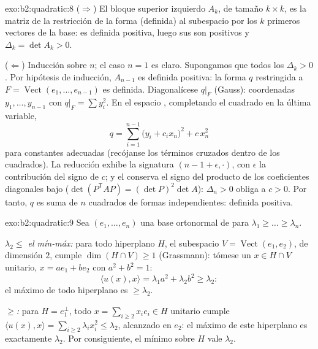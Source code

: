\begin{solution}{exo:b2:quadratic:8}
($\Rightarrow$) El bloque superior izquierdo $A_k$, de tamaño $k \times
k$, es la matriz de la restricción de la forma (definida) al subespacio
 por los $k$ primeros vectores de la base: es definida
positiva, luego sus  son positivos y $\Delta_k = \det A_k
> 0$.

($\Leftarrow$) Inducción sobre $n$; el caso $n = 1$ es claro.
Supongamos que todos los $\Delta_k > 0$. Por hipótesis de inducción,
$A_{n-1}$ es definida positiva: la forma $q$ restringida a $F =
\operatorname{Vect}(e_1, \dots, e_{n-1})$ es definida. Diagonalícese
$q|_F$ (Gauss): coordenadas $y_1, \dots, y_{n-1}$ con $q|_F = \sum
y_i^2$. En el espacio , completando el cuadrado en la última
variable,
\[
q = \sum_{i=1}^{n-1} \bigl(y_i + c_i x_n\bigr)^2 + c\,x_n^2
\]
para constantes adecuadas (recójanse los términos cruzados dentro de
los cuadrados). La reducción exhibe la signatura $(n-1 + \epsilon,
\cdot)$, con $\epsilon$ la contribución del signo de $c$; y el
 conserva el signo del producto de los coeficientes
diagonales bajo  ($\det(P^{\mathsf T}AP) = (\det P)^2\det
A$): $\Delta_n > 0$ obliga a $c > 0$. Por tanto, $q$ es suma de $n$
cuadrados de formas independientes: definida positiva.
\end{solution}

\begin{solution}{exo:b2:quadratic:9}
Sea $(e_1, \dots, e_n)$ una base ortonormal de  para
$\lambda_1 \geq \dots \geq \lambda_n$.

\emph{$\lambda_2 \leq$ el mín-máx:} para todo hiperplano $H$, el
subespacio $V = \operatorname{Vect}(e_1, e_2)$, de dimensión $2$,
cumple $\dim(H \cap V) \geq 1$ (Grassmann): tómese un $x \in H \cap V$
unitario, $x = ae_1 + be_2$ con $a^2 + b^2 = 1$:
\[
\langle u(x), x\rangle = \lambda_1 a^2 + \lambda_2 b^2 \geq
\lambda_2 :
\]
el máximo de todo hiperplano es $\geq \lambda_2$.

\emph{$\geq$:} para $H = e_1^{\perp}$, todo $x = \sum_{i\geq2} x_ie_i
\in H$ unitario cumple $\langle u(x), x\rangle = \sum_{i \geq 2}
\lambda_i x_i^2 \leq \lambda_2$, alcanzado en $e_2$: el máximo de este
hiperplano es exactamente $\lambda_2$. Por consiguiente, el mínimo
sobre $H$ vale $\lambda_2$.
\end{solution}

